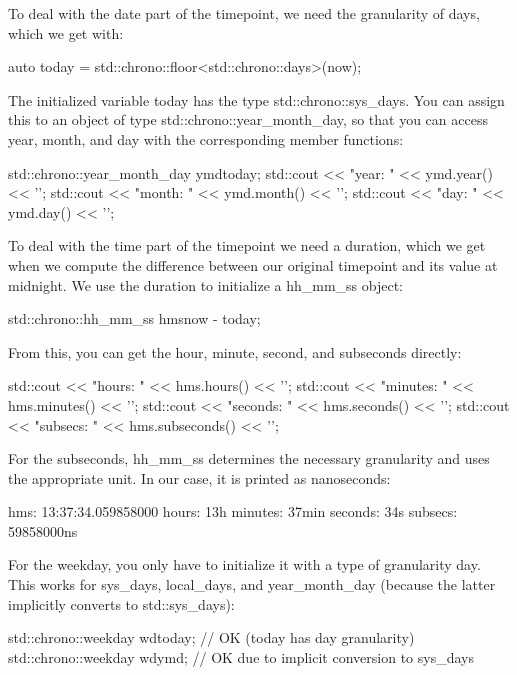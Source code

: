 To deal with the date part of the timepoint, we need the granularity of days, which we get with:

\begin{cpp}
auto today = std::chrono::floor<std::chrono::days>(now);
\end{cpp}

The initialized variable today has the type std::chrono::sys\_days. You can assign this to an object of type std::chrono::year\_month\_day, so that you can access year, month, and day with the corresponding member functions:

\begin{cpp}
std::chrono::year_month_day ymd{today};
std::cout << "year: " << ymd.year() << '\n';
std::cout << "month: " << ymd.month() << '\n';
std::cout << "day: " << ymd.day() << '\n';
\end{cpp}

To deal with the time part of the timepoint we need a duration, which we get when we compute the difference between our original timepoint and its value at midnight. We use the duration to initialize a hh\_mm\_ss object:

\begin{cpp}
std::chrono::hh_mm_ss hms{now - today};
\end{cpp}

From this, you can get the hour, minute, second, and subseconds directly:

\begin{cpp}
std::cout << "hours: " << hms.hours() << '\n';
std::cout << "minutes: " << hms.minutes() << '\n';
std::cout << "seconds: " << hms.seconds() << '\n';
std::cout << "subsecs: " << hms.subseconds() << '\n';
\end{cpp}

For the subseconds, hh\_mm\_ss determines the necessary granularity and uses the appropriate unit. In our case, it is printed as nanoseconds:

\begin{shell}
hms:      13:37:34.059858000
hours:    13h
minutes:  37min
seconds:  34s
subsecs:  59858000ns
\end{shell}

For the weekday, you only have to initialize it with a type of granularity day. This works for sys\_days, local\_days, and year\_month\_day (because the latter implicitly converts to std::sys\_days):

\begin{cpp}
std::chrono::weekday wd{today}; // OK (today has day granularity)
std::chrono::weekday wd{ymd}; // OK due to implicit conversion to sys_days
\end{cpp}

